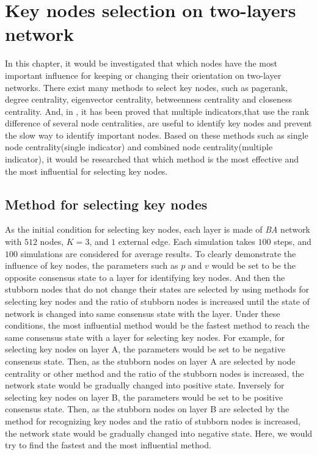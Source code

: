 
\chapter{Key nodes selection on two-layers network}
\label{chap5}
In this chapter, it would be investigated that which nodes have the most important influence for keeping or changing their orientation on two-layer networks. There exist many methods to select key nodes, such as pagerank, degree centrality, eigenvector centrality, betweenness centrality and closeness centrality. And, in \parencite{mesgari2015, huang2014}, it has been proved that multiple indicators,that use the rank difference of several node centralities, are useful to identify key nodes and prevent the slow way to identify important nodes. Based on these methods such as single node centrality(single indicator) and combined node centrality(multiple indicator), it would be researched that which method is the most effective and the most influential for selecting key nodes.  

\section{Method for selecting key nodes}
\label{sec:method for finding key nodes}
As the initial condition for selecting key nodes, each layer is made of \textit{BA} network with $512$ nodes, $K=3$, and $1$ external edge. Each simulation takes $100$ steps, and $100$ simulations are considered for average results. To clearly demonstrate the influence of key nodes, the parameters such as $p$ and $v$ would be set to be the opposite consensus state to a layer for identifying key nodes. And then the stubborn nodes that do not change their states are selected by using methods for selecting key nodes and the ratio of stubborn nodes is increased until the state of network is changed into same consensus state with the layer. Under these conditions, the most influential method would be the fastest method to reach the same consensus state with a layer for selecting key nodes. For example, for selecting key nodes on layer A, the parameters would be set to be negative consensus state. Then, as the stubborn nodes on layer A are selected by node centrality or other method and the ratio of the stubborn nodes is increased, the network state would be gradually changed into positive state. Inversely for selecting key nodes on layer B, the parameters would be set to be positive consensus state. Then, as the stubborn nodes on layer B are selected by the method for recognizing key nodes and the ratio of stubborn nodes is increased, the network state would be gradually changed into negative state. Here, we would try to find the fastest and the most influential method.

